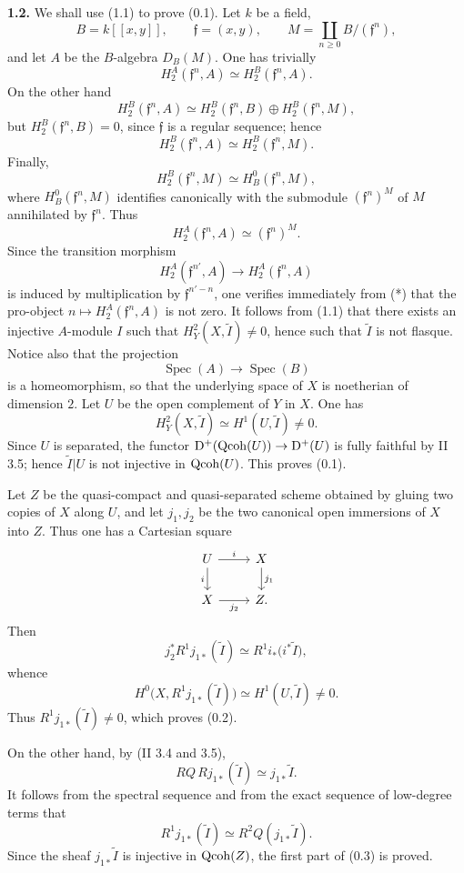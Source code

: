 \documentclass[11pt]{article}
\newcommand{\Spec}{\operatorname{Spec}}
\begin{document}
\textbf{1.2.} We shall use (1.1) to prove (0.1). Let $k$ be a field,
\[
B=k[[x,y]],\qquad \mathfrak f=(x,y),\qquad
M=\coprod_{n\geq0} B/(\mathfrak f^n),
\]
and let $A$ be the $B$-algebra $D_B(M)$. One has trivially
\[
H^A_2(\mathfrak f^n,A)\simeq H^B_2(\mathfrak f^n,A).
\]
On the other hand
\[
H^B_2(\mathfrak f^n,A)\simeq H^B_2(\mathfrak f^n,B)\oplus H^B_2(\mathfrak f^n,M),
\]
but $H^B_2(\mathfrak f^n,B)=0$, since $\mathfrak f$ is a regular sequence; hence
\[
H^B_2(\mathfrak f^n,A)\simeq H^B_2(\mathfrak f^n,M).
\]
Finally,
\[
H^B_2(\mathfrak f^n,M)\simeq H^0_B(\mathfrak f^n,M),
\]
where $H^0_B(\mathfrak f^n,M)$ identifies canonically with the submodule $(\mathfrak f^n)^M$ of $M$ annihilated by $\mathfrak f^n$. Thus
\begin{equation}\tag{*}
H^A_2(\mathfrak f^n,A)\simeq (\mathfrak f^n)^M.
\end{equation}
Since the transition morphism
\[
H^A_2(\mathfrak f^{n'},A)\longrightarrow H^A_2(\mathfrak f^n,A)
\]
is induced by multiplication by $\mathfrak f^{n'-n}$, one verifies immediately from (*) that the pro-object $n\mapsto H^A_2(\mathfrak f^n,A)$ is not zero. It follows from (1.1) that there exists an injective $A$-module $I$ such that $H_Y^2(X,\widetilde I)\neq0$, hence such that $\widetilde I$ is not flasque. Notice also that the projection
\[
\Spec(A)\longrightarrow\Spec(B)
\]
is a homeomorphism, so that the underlying space of $X$ is noetherian of dimension $2$. Let $U$ be the open complement of $Y$ in $X$. One has
\[
H_Y^2(X,\widetilde I)\simeq H^1(U,\widetilde I)\neq0.
\]
Since $U$ is separated, the functor $\mathrm D^+(\operatorname{Qcoh}(U))\to\mathrm D^+(U)$ is fully faithful by II 3.5; hence $\widetilde I|U$ is not injective in $\operatorname{Qcoh}(U)$. This proves (0.1).

Let $Z$ be the quasi-compact and quasi-separated scheme obtained by gluing two copies of $X$ along $U$, and let $j_1,j_2$ be the two canonical open immersions of $X$ into $Z$. Thus one has a Cartesian square
\[
\begin{tikzcd}
U \arrow[r,"i"] \arrow[d,"i"'] & X \arrow[d,"j_1"]\\
X \arrow[r,"j_2"'] & Z .
\end{tikzcd}
\]
Then
\[
j_2^*R^1j_{1*}(\widetilde I)\simeq R^1i_*\bigl(i^*\widetilde I\bigr),
\]
whence
\[
H^0\bigl(X,R^1j_{1*}(\widetilde I)\bigr)\simeq H^1(U,\widetilde I)\neq0.
\]
Thus $R^1j_{1*}(\widetilde I)\neq0$, which proves (0.2).

On the other hand, by (II 3.4 and 3.5),
\[
RQ\,Rj_{1*}(\widetilde I)\simeq j_{1*}\widetilde I.
\]
It follows from the spectral sequence and from the exact sequence of low-degree terms that
\[
R^1j_{1*}(\widetilde I)\simeq R^2Q(j_{1*}\widetilde I).
\]
Since the sheaf $j_{1*}\widetilde I$ is injective in $\operatorname{Qcoh}(Z)$, the first part of (0.3) is proved.
\end{document}
